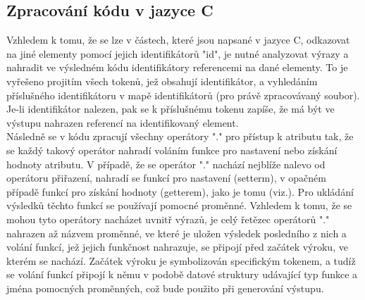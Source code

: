 \documentclass[report,11pt]{elsarticle}
\begin{document}
\subsection{Zpracování kódu v jazyce C}
Vzhledem k tomu, že se lze v částech, které jsou napsané v jazyce C, odkazovat na jiné elementy pomocí jejich identifikátorů "id", je nutné analyzovat výrazy a nahradit ve výsledném kódu identifikátory referencemi na dané elementy. To je vyřešeno projitím všech tokenů, jež obsahují identifikátor, a vyhledáním příslušného identifikátoru v mapě identifikátorů (pro právě zpracovávaný soubor). Je-li identifikátor nalezen, pak se k příslušnému tokenu zapíše, že má být ve výstupu nahrazen referencí na identifikovaný element.\\
Následně se v kódu zpracují všechny operátory "." pro přístup k atributu tak, že se každý takový operátor nahradí voláním funkce pro nastavení nebo získání hodnoty atributu. V případě, že se operátor "." nachází nejblíže nalevo od operátoru přiřazení, nahradí se funkcí pro nastavení (setterm), v opačném případě funkcí pro získání hodnoty (getterem), jako je tomu (viz.). Pro ukládání výsledků těchto funkcí se používají pomocné proměnné. Vzhledem k tomu, že se mohou tyto operátory nacházet uvnitř výrazů, je celý řetězec operátorů "." nahrazen až názvem proměnné, ve které je uložen výsledek posledního z nich a volání funkcí, jež jejich funkčnost nahrazuje, se připojí před začátek výroku, ve kterém se nachází. Začátek výroku je symbolizován specifickým tokenem, a tudíž se volání funkcí připojí k němu v podobě datové struktury udávající typ funkce a jména pomocných proměnných, což bude použito při generování výstupu.
\end{document}
